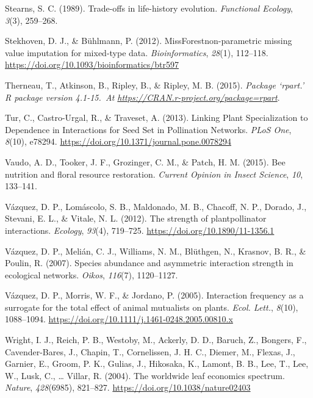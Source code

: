\documentclass[
  12pt,
  a4paper,
]{article}
\newlength{\cslhangindent}
\newlength{\cslentryspacingunit} %
\newenvironment{CSLReferences}[2] %
 {%
  \setlength{\parindent}{0pt}
  \ifodd #1
  \let\oldpar\par
  \def\par{\hangindent=\cslhangindent\oldpar}
  \fi
  \setlength{\parskip}{#2\cslentryspacingunit}
 }%
 {}
\begin{document}
\begin{CSLReferences}{1}{0}
\leavevmode{}%
Stearns, S. C. (1989). Trade-offs in life-history evolution. \emph{Functional Ecology}, \emph{3}(3), 259--268.

\leavevmode{}%
Stekhoven, D. J., \& Bühlmann, P. (2012). {MissForest}\textemdash non-parametric missing value imputation for mixed-type data. \emph{Bioinformatics}, \emph{28}(1), 112--118. \url{https://doi.org/10.1093/bioinformatics/btr597}

\leavevmode{}%
Therneau, T., Atkinson, B., Ripley, B., \& Ripley, M. B. (2015). \emph{Package {`rpart.'} R package version 4.1-15.~At \href{https://CRAN.R-project.org/package=rpart}{https://CRAN.r-project.org/package=rpart}}.

\leavevmode{}%
Tur, C., Castro-Urgal, R., \& Traveset, A. (2013). Linking {Plant Specialization} to {Dependence} in {Interactions} for {Seed Set} in {Pollination Networks}. \emph{PLoS One}, \emph{8}(10), e78294. \url{https://doi.org/10.1371/journal.pone.0078294}

\leavevmode{}%
Vaudo, A. D., Tooker, J. F., Grozinger, C. M., \& Patch, H. M. (2015). Bee nutrition and floral resource restoration. \emph{Current Opinion in Insect Science}, \emph{10}, 133--141.

\leavevmode{}%
Vázquez, D. P., Lomáscolo, S. B., Maldonado, M. B., Chacoff, N. P., Dorado, J., Stevani, E. L., \& Vitale, N. L. (2012). The strength of plant\textendash pollinator interactions. \emph{Ecology}, \emph{93}(4), 719--725. \url{https://doi.org/10.1890/11-1356.1}

\leavevmode{}%
Vázquez, D. P., Melián, C. J., Williams, N. M., Blüthgen, N., Krasnov, B. R., \& Poulin, R. (2007). Species abundance and asymmetric interaction strength in ecological networks. \emph{Oikos}, \emph{116}(7), 1120--1127.

\leavevmode{}%
Vázquez, D. P., Morris, W. F., \& Jordano, P. (2005). Interaction frequency as a surrogate for the total effect of animal mutualists on plants. \emph{Ecol. Lett.}, \emph{8}(10), 1088--1094. \url{https://doi.org/10.1111/j.1461-0248.2005.00810.x}

\leavevmode{}%
Wright, I. J., Reich, P. B., Westoby, M., Ackerly, D. D., Baruch, Z., Bongers, F., Cavender-Bares, J., Chapin, T., Cornelissen, J. H. C., Diemer, M., Flexas, J., Garnier, E., Groom, P. K., Gulias, J., Hikosaka, K., Lamont, B. B., Lee, T., Lee, W., Lusk, C., \ldots{} Villar, R. (2004). The worldwide leaf economics spectrum. \emph{Nature}, \emph{428}(6985), 821--827. \url{https://doi.org/10.1038/nature02403}

\end{CSLReferences}
\end{document}
